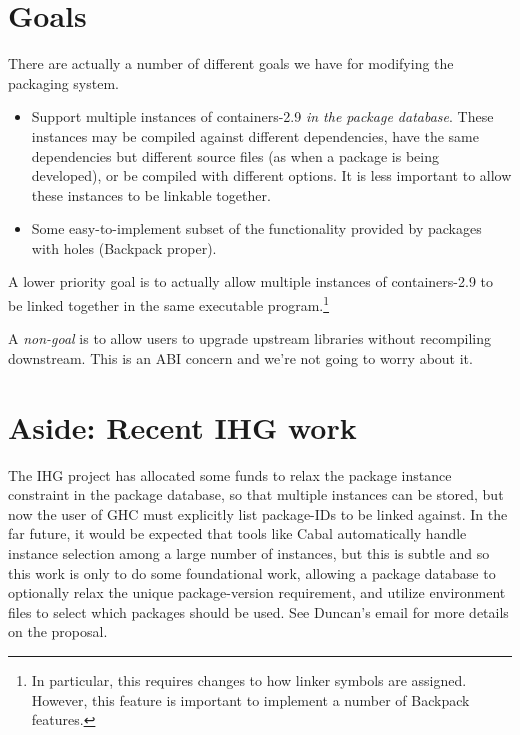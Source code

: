 \documentclass{article}
\begin{document}
\section{Goals}

There are actually a number of different goals we have for modifying the
packaging system.

\begin{itemize}
    \item Support multiple instances of containers-2.9 \emph{in the
        package database}.  These instances may be compiled against
        different dependencies, have the same dependencies but different
        source files (as when a package is being developed), or be
        compiled with different options.  It is less important to allow
        these instances to be linkable together.

    \item Some easy-to-implement subset of the functionality provided by
        packages with holes (Backpack proper).
\end{itemize}

A lower priority goal is to actually allow multiple instances of
containers-2.9 to be linked together in the same executable
program.\footnote{In particular, this requires changes to how linker symbols
are assigned. However, this feature is important to implement a number
of Backpack features.}

A \emph{non-goal} is to allow users to upgrade upstream libraries
without recompiling downstream. This is an ABI concern and we're not
going to worry about it.

\section{Aside: Recent IHG work}\label{sec:ihg}

The IHG project has allocated some funds to relax the package instance
constraint in the package database, so that multiple instances can be
stored, but now the user of GHC must explicitly list package-IDs to be
linked against.  In the far future, it would be expected that tools like
Cabal automatically handle instance selection among a large number of
instances, but this is subtle and so this work is only to do some
foundational work, allowing a package database to optionally relax the
unique package-version requirement, and utilize environment files to
select which packages should be used.  See Duncan's email for more
details on the proposal.
\end{document}
